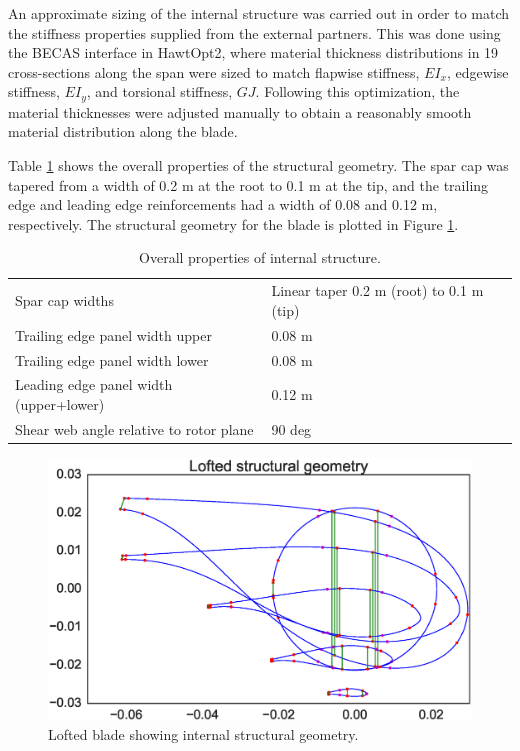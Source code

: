 An approximate sizing of the internal structure was carried out in order to match the stiffness properties supplied from the external partners.
This was done using the BECAS interface in HawtOpt2, where material thickness distributions in 19 cross-sections along the span were sized to match flapwise stiffness, $EI_x$, edgewise stiffness, $EI_y$, and torsional stiffness, $GJ$.
Following this optimization, the material thicknesses were adjusted manually to obtain a reasonably smooth material distribution along the blade.

Table \ref{tab:structure_props} shows the overall properties of the structural geometry. 
The spar cap was tapered from a width of 0.2 m at the root to 0.1 m at the tip, and the trailing edge and leading edge reinforcements had a width of 0.08 and 0.12 m, respectively.
The structural geometry for the blade is plotted in Figure \ref{fig:loftedstructure_baseline_tipview}.

\begin{table}[h!]
\caption{Overall properties of internal structure.}
\centering
\small
\begin{tabular}{ll}
\hline
	Spar cap widths	 						& Linear taper 0.2 m (root) to 0.1 m (tip) \\
	Trailing edge panel width upper			& 0.08 m	\\
	Trailing edge panel width lower			& 0.08 m	\\
	Leading edge panel width (upper+lower)	& 0.12 m \\
	Shear web angle relative to rotor plane	& 90 deg	\\
\hline
\end{tabular}
\label{tab:structure_props}
\end{table}


\begin{figure}[pht]
\begin{center}
	\includegraphics[width=1\linewidth]{figures/baseline_blade_tipview.eps}
\end{center}
\caption{Lofted blade showing internal structural geometry.}
\label{fig:loftedstructure_baseline_tipview}
\end{figure}


